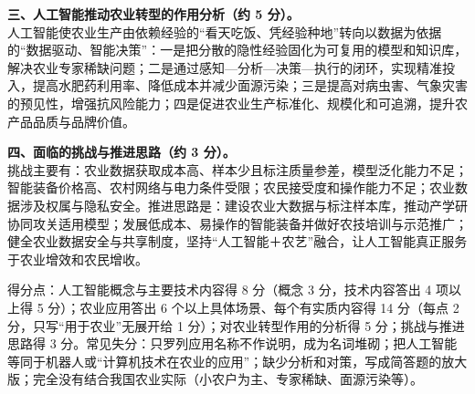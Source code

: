 \documentclass[a4paper,11pt]{article}
\begin{document}
\textbf{三、人工智能推动农业转型的作用分析（约 5 分）。}\\
人工智能使农业生产由依赖经验的“看天吃饭、凭经验种地”转向以数据为依据的“数据驱动、智能决策”：一是把分散的隐性经验固化为可复用的模型和知识库，解决农业专家稀缺问题；二是通过感知—分析—决策—执行的闭环，实现精准投入，提高水肥药利用率、降低成本并减少面源污染；三是提高对病虫害、气象灾害的预见性，增强抗风险能力；四是促进农业生产标准化、规模化和可追溯，提升农产品品质与品牌价值。

\textbf{四、面临的挑战与推进思路（约 3 分）。}\\
挑战主要有：农业数据获取成本高、样本少且标注质量参差，模型泛化能力不足；智能装备价格高、农村网络与电力条件受限；农民接受度和操作能力不足；农业数据涉及权属与隐私安全。推进思路是：建设农业大数据与标注样本库，推动产学研协同攻关适用模型；发展低成本、易操作的智能装备并做好农技培训与示范推广；健全农业数据安全与共享制度，坚持“人工智能＋农艺”融合，让人工智能真正服务于农业增效和农民增收。

\begin{analysis}得分点：人工智能概念与主要技术内容得 8 分（概念 3 分，技术内容答出 4 项以上得 5 分）；农业应用答出 6 个以上具体场景、每个有实质内容得 14 分（每点 2 分，只写“用于农业”无展开给 1 分）；对农业转型作用的分析得 5 分；挑战与推进思路得 3 分。常见失分：只罗列应用名称不作说明，成为名词堆砌；把人工智能等同于机器人或“计算机技术在农业的应用”；缺少分析和对策，写成简答题的放大版；完全没有结合我国农业实际（小农户为主、专家稀缺、面源污染等）。\end{analysis}
\end{document}
